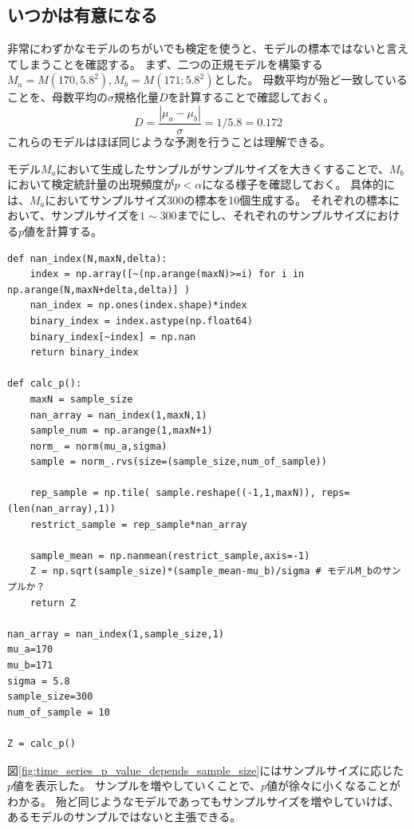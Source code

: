 \subsection{いつかは有意になる}\label{large_sample_size_significant}
非常にわずかなモデルのちがいでも検定を使うと、モデルの標本ではないと言えてしまうことを確認する。
まず、二つの正規モデルを構築する$M_a=M(170,5.8^2),M_b=M(171;5.8^2)$とした。
母数平均が殆ど一致していることを、母数平均の$\sigma$規格化量$D$を計算することで確認しておく。
\begin{equation*}
 D=\frac{|\mu_a-\mu_b|}{\sigma} = 1/5.8=0.172
\end{equation*}
これらのモデルはほぼ同じような予測を行うことは理解できる。

モデル$M_a$において生成したサンプルがサンプルサイズを大きくすることで、$M_b$において検定統計量の出現頻度が$p<\alpha$になる様子を確認しておく。
具体的には、$M_a$においてサンプルサイズ$300$の標本を10個生成する。
それぞれの標本において、サンプルサイズを$1\sim 300$までにし、それぞれのサンプルサイズにおける$p$値を計算する。

\begin{lstlisting}
def nan_index(N,maxN,delta):
    index = np.array([~(np.arange(maxN)>=i) for i in np.arange(N,maxN+delta,delta)] )
    nan_index = np.ones(index.shape)*index
    binary_index = index.astype(np.float64)
    binary_index[~index] = np.nan
    return binary_index

def calc_p():
    maxN = sample_size
    nan_array = nan_index(1,maxN,1)
    sample_num = np.arange(1,maxN+1)
    norm_ = norm(mu_a,sigma)
    sample = norm_.rvs(size=(sample_size,num_of_sample))

    rep_sample = np.tile( sample.reshape((-1,1,maxN)), reps= (len(nan_array),1))
    restrict_sample = rep_sample*nan_array

    sample_mean = np.nanmean(restrict_sample,axis=-1)
    Z = np.sqrt(sample_size)*(sample_mean-mu_b)/sigma # モデルM_bのサンプルか？
    return Z

nan_array = nan_index(1,sample_size,1)
mu_a=170
mu_b=171
sigma = 5.8
sample_size=300
num_of_sample = 10

Z = calc_p()
\end{lstlisting}

図\ref{fig:time_series_p_value_depends_sample_size}にはサンプルサイズに応じた$p$値を表示した。
サンプルを増やしていくことで、$p$値が徐々に小くなることがわかる。
殆ど同じようなモデルであってもサンプルサイズを増やしていけば、あるモデルのサンプルではないと主張できる。

